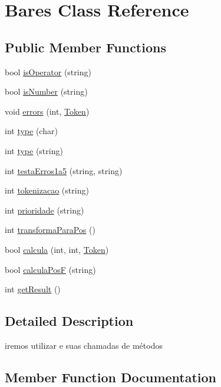 \hypertarget{classBares}{}\section{Bares Class Reference}
\label{classBares}
\subsection*{Public Member Functions}
\begin{DoxyCompactItemize}
\item 
bool \hyperlink{classBares_a7099edd8b6847c430a86b5ad8c8a67e8}{is\+Operator} (string)
\item 
bool \hyperlink{classBares_ac2c9417ba43ecbf6a1731e7b78f127e9}{is\+Number} (string)
\item 
void \hyperlink{classBares_a5fdb9605f566885b1bd624b76030babf}{errors} (int, \hyperlink{structToken}{Token})
\item 
int \hyperlink{classBares_aa31cf3da4e7e28ceb5da86e7118f30f6}{type} (char)
\item 
int \hyperlink{classBares_af362a384ef4500b25321b99f1e494e59}{type} (string)
\item 
int \hyperlink{classBares_a845256ca5c22ff7840f97a01650949c7}{testa\+Erros1a5} (string, string)
\item 
int \hyperlink{classBares_a0fec70452075bb8f1137b620ddb9c404}{tokenizacao} (string)
\item 
int \hyperlink{classBares_a76b64240266d8df966666db231ce50de}{prioridade} (string)
\item 
int \hyperlink{classBares_a3e756074dd60f5fae9b76a87bc71a854}{transforma\+Para\+Pos} ()
\item 
bool \hyperlink{classBares_a58727037a5fab7598830f0ec4d242d8c}{calcula} (int, int, \hyperlink{structToken}{Token})
\item 
bool \hyperlink{classBares_a404b6eb76c4370c660c57aedafcfe943}{calcula\+Pos\+F} (string)
\item 
int \hyperlink{classBares_a017a532e599d739e926f81fa5678b965}{get\+Result} ()
\end{DoxyCompactItemize}


\subsection{Detailed Description}
iremos utilizar e suas chamadas de métodos 

\subsection{Member Function Documentation}
\hypertarget{classBares_a58727037a5fab7598830f0ec4d242d8c}{}

